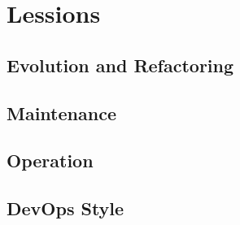 \chapter{Lessions}

\section{Evolution and Refactoring}

\section{Maintenance}

\section{Operation}

\section{DevOps Style}